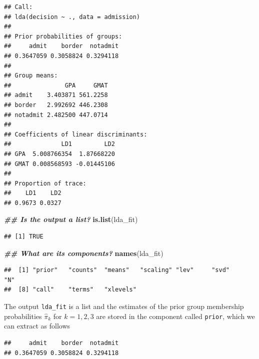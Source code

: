 \documentclass[
]{article}
\newenvironment{Shaded}{\begin{snugshade}}{\end{snugshade}}
\newcommand{\DocumentationTok}[1]{\textcolor[rgb]{0.56,0.35,0.01}{\textbf{\textit{#1}}}}
\newcommand{\FunctionTok}[1]{\textcolor[rgb]{0.13,0.29,0.53}{\textbf{#1}}}
\newcommand{\NormalTok}[1]{#1}
\newcommand{\SpecialCharTok}[1]{\textcolor[rgb]{0.81,0.36,0.00}{\textbf{#1}}}
\begin{document}
\begin{verbatim}
## Call:
## lda(decision ~ ., data = admission)
## 
## Prior probabilities of groups:
##     admit    border  notadmit 
## 0.3647059 0.3058824 0.3294118 
## 
## Group means:
##               GPA     GMAT
## admit    3.403871 561.2258
## border   2.992692 446.2308
## notadmit 2.482500 447.0714
## 
## Coefficients of linear discriminants:
##              LD1         LD2
## GPA  5.008766354  1.87668220
## GMAT 0.008568593 -0.01445106
## 
## Proportion of trace:
##    LD1    LD2 
## 0.9673 0.0327
\end{verbatim}

\begin{Shaded}
\begin{Highlighting}[]
\DocumentationTok{\#\# Is the output a list?}
\FunctionTok{is.list}\NormalTok{(lda\_fit)}
\end{Highlighting}
\end{Shaded}

\begin{verbatim}
## [1] TRUE
\end{verbatim}

\begin{Shaded}
\begin{Highlighting}[]
\DocumentationTok{\#\# What are its components?}
\FunctionTok{names}\NormalTok{(lda\_fit)}
\end{Highlighting}
\end{Shaded}

\begin{verbatim}
##  [1] "prior"   "counts"  "means"   "scaling" "lev"     "svd"     "N"      
##  [8] "call"    "terms"   "xlevels"
\end{verbatim}

The output \texttt{lda\_fit} is a list and the estimates of the prior
group membership probabilities \(\hat{\pi}_k\) for \(k=1,2,3\) are
stored in the component called \texttt{prior}, which we can extract as
follows

\begin{Shaded}
\end{Shaded}

\begin{verbatim}
##     admit    border  notadmit 
## 0.3647059 0.3058824 0.3294118
\end{verbatim}
\end{document}
